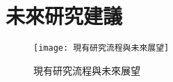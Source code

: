 \chapter{未來研究建議}
\begin{figure}[hbt!]
\begin{center}
\texttt{[image: 現有研究流程與未來展望]}
\caption{\Large 現有研究流程與未來展望}
\label{fig.現有研究流程與未來展望}
\end{center}
\end{figure}
